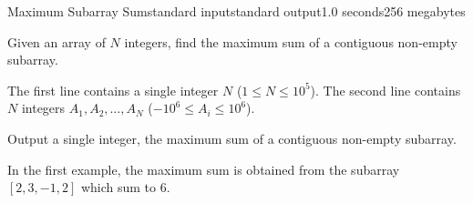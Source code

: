 \begin{problem}{Maximum Subarray Sum}{standard input}{standard output}{1.0 seconds}{256 megabytes}

Given an array of $N$ integers, find the maximum sum of a contiguous non-empty subarray.

The first line contains a single integer $N$ ($1 \le N \le 10^5$).
The second line contains $N$ integers $A_1, A_2, \dots, A_N$ ($-10^6 \le A_i \le 10^6$).

\outputfile
Output a single integer, the maximum sum of a contiguous non-empty subarray.

\Examples

\begin{example}
%
%
\end{example}

\note
In the first example, the maximum sum is obtained from the subarray $[2, 3, -1, 2]$ which sum to 6.

\end{problem}